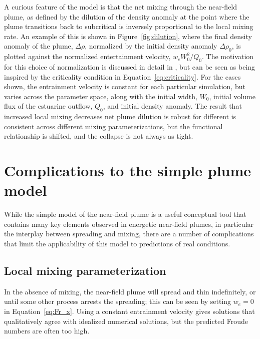 \documentclass[12pt]{article}
\begin{document}
{A curious feature of the model is that the net mixing through the near-field plume, as defined by the dilution of the density anomaly at the point where the plume transitions back to subcritical is inversely proportional to the local mixing rate. An example of this is shown in Figure~\ref{fig:dilution}, where the final density anomaly of the plume, $\Delta \rho$, normalized by the initial density anomaly $\Delta \rho_0$, is plotted against the normalized entertainment velocity, $w_e W_0^2 / Q_0$. The motivation for this choice of normalization is discussed in detail in \citet{hetland:10a}, but can be seen as being inspired by the criticality condition in Equation~\ref{eq:criticality}. For the cases shown, the entrainment velocity is constant for each particular simulation, but varies across the parameter space, along with the initial width, $W_0$, initial volume flux of the estuarine outflow, $Q_0$, and initial density anomaly. The result that increased local mixing decreases net plume dilution is robust for different is consistent across different mixing parameterizations, but the functional relationship is shifted, and the collapse is not always as tight.


\section{Complications to the simple plume model}

While the simple model of the near-field plume is a useful conceptual tool that contains many key elements observed in energetic near-field plumes, in particular the interplay between spreading and mixing, there are a number of complications that limit the applicability of this model to predictions of real conditions.

\subsection{Local mixing parameterization}

In the absence of mixing, the near-field plume will spread and thin indefinitely, or until some other process arrests the spreading; this can be seen by setting $w_e=0$ in Equation~\ref{eq:Fr_x}. Using a constant entrainment velocity gives solutions that qualitatively agree with idealized numerical solutions, but the predicted Froude numbers are often too high. 

}
\end{document}
